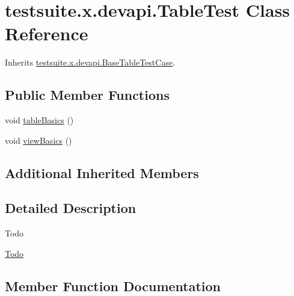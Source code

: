 \hypertarget{classtestsuite_1_1x_1_1devapi_1_1_table_test}{}\section{testsuite.\+x.\+devapi.\+Table\+Test Class Reference}
\label{classtestsuite_1_1x_1_1devapi_1_1_table_test}


Inherits \mbox{\hyperlink{classtestsuite_1_1x_1_1devapi_1_1_base_table_test_case}{testsuite.\+x.\+devapi.\+Base\+Table\+Test\+Case}}.

\subsection*{Public Member Functions}
\begin{DoxyCompactItemize}
\item 
void \mbox{\hyperlink{classtestsuite_1_1x_1_1devapi_1_1_table_test_a1aff100d62d541e8b13aa28bf880d2b9}{table\+Basics}} ()
\item 
void \mbox{\hyperlink{classtestsuite_1_1x_1_1devapi_1_1_table_test_ae3685af97260bbfe0e12aa371f38d059}{view\+Basics}} ()
\end{DoxyCompactItemize}
\subsection*{Additional Inherited Members}


\subsection{Detailed Description}
\begin{DoxyRefDesc}{Todo}
\item[\mbox{\hyperlink{todo__todo000011}{Todo}}]\end{DoxyRefDesc}


\subsection{Member Function Documentation}
\mbox{\label{classtestsuite_1_1x_1_1devapi_1_1_table_test_a1aff100d62d541e8b13aa28bf880d2b9}} 
